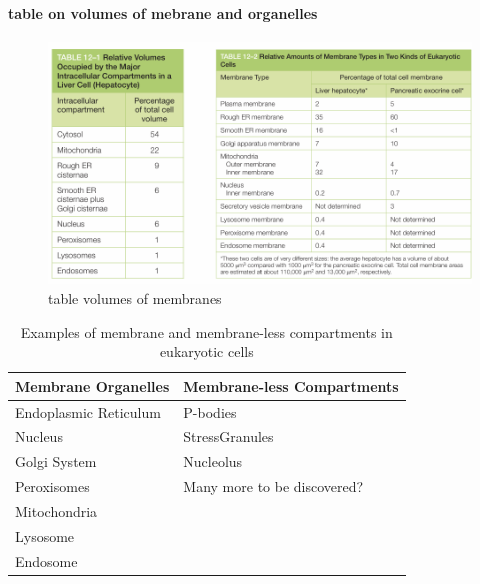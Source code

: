 \documentclass[../main.tex]{subfiles}
\begin{document}
  \paragraph{table on volumes of mebrane and organelles}

  \begin{figure}[H]
      \centering
      \includegraphics[width=\linewidth]{TableVolumes.png}
      \caption{table volumes of membranes}
      \label{fig:enter-label}
  \end{figure}

\begin{table}[h!]
\centering
\begin{tabular}{|l|l|}
\hline
\textbf{Membrane Organelles} & \textbf{Membrane-less Compartments} \\
\hline
Endoplasmic Reticulum             & \gls{P-bodies}                             \\
Nucleus                           & \gls{StressGranules}                      \\
Golgi System                      & Nucleolus                            \\
Peroxisomes                       & Many more to be discovered?          \\
Mitochondria                      &                                      \\
Lysosome                          &                                      \\
Endosome                          &                                      \\
\hline
\end{tabular}
\caption{Examples of membrane and membrane-less compartments in eukaryotic cells}
\end{table}
\end{document}
